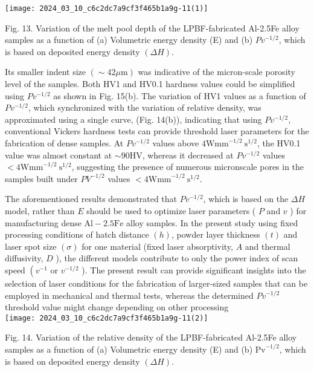 \documentclass[10pt]{article}
\begin{document}
\begin{center}
\texttt{[image: 2024\_03\_10\_c6c2dc7a9cf3f465b1a9g-11(1)]}
\end{center}

Fig. 13. Variation of the melt pool depth of the LPBF-fabricated Al-2.5Fe alloy samples as a function of (a) Volumetric energy density (E) and (b) $P v^{-1 / 2}$, which is based on deposited energy density $(\Delta H)$.

Its smaller indent size $(\sim 42 \mu \mathrm{m})$ was indicative of the micron-scale porosity level of the samples. Both HV1 and HV0.1 hardness values could be simplified using $P v^{-1 / 2}$ as shown in Fig. 15(b). The variation of HV1 values as a function of $P v^{-1 / 2}$, which synchronized with the variation of relative density, was approximated using a single curve, (Fig. 14(b)), indicating that using $P v^{-1 / 2}$, conventional Vickers hardness tests can provide threshold laser parameters for the fabrication of dense samples. At $P v^{-1 / 2}$ values above $4 \mathrm{Wmm}^{-1 / 2} \mathrm{~s}^{1 / 2}$, the HV0.1 value was almost constant at $\sim 90 \mathrm{HV}$, whereas it decreased at $P v^{-1 / 2}$ values $<4 \mathrm{Wmm}^{-1 / 2} \mathrm{~s}^{1 / 2}$, suggesting the presence of numerous micronscale pores in the samples built under $P V^{-1 / 2}$ values $<4 \mathrm{Wmm}^{-1 / 2} \mathrm{~s}^{1 / 2}$.

The aforementioned results demonstrated that $P v^{-1 / 2}$, which is based on the $\Delta H$ model, rather than $E$ should be used to optimize laser parameters ( $P$ and $v$ ) for manufacturing dense $\mathrm{Al}-2.5 \mathrm{Fe}$ alloy samples. In the present study using fixed processing conditions of hatch distance $(h)$, powder layer thickness $(t)$ and laser spot size $(\sigma)$ for one material (fixed laser absorptivity, $A$ and thermal diffusivity, $D$ ), the different models contribute to only the power index of scan speed $\left(v^{-1}\right.$ or $v^{-1 / 2}$ ). The present result can provide significant insights into the selection of laser conditions for the fabrication of larger-sized samples that can be employed in mechanical and thermal tests, whereas the determined $P v^{-1 / 2}$ threshold value might change depending on other processing\\
\texttt{[image: 2024\_03\_10\_c6c2dc7a9cf3f465b1a9g-11(2)]}

Fig. 14. Variation of the relative density of the LPBF-fabricated Al-2.5Fe alloy samples as a function of (a) Volumetric energy density (E) and (b) $\mathrm{Pv}^{-1 / 2}$, which is based on deposited energy density $(\Delta H)$.
\end{document}
